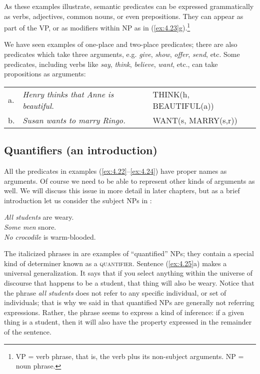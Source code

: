 As these examples illustrate, semantic predicates can be expressed grammatically as verbs, adjectives, common nouns, or even prepositions. They can appear as part of the VP, or as modifiers within NP as in (\ref{ex:4.23}g).\footnote{VP = verb phrase, that is, the verb plus its non-subject arguments. NP = noun phrase.}



We have seen examples of one-place and two-place predicates; there are also predicates which take three arguments, e.g. \textit{give}, \textit{show}, \textit{offer}, \textit{send}, etc. Some predicates, including verbs like \textit{say}, \textit{think}, \textit{believe}, \textit{want}, etc., can take propositions as arguments:


\ea \label{ex:4.24}
\begin{tabular}[t]{lll}
a. & \textit{Henry thinks that Anne is beautiful.}  & THINK(h, BEAUTIFUL(a))\\
b. & \textit{Susan wants to marry Ringo.} & WANT(s, MARRY(s,r))
\end{tabular}
\z

\subsection{Quantifiers (an introduction)}\label{sec:4.4.1}

All the predicates in examples (\ref{ex:4.22}--\ref{ex:4.24}) have proper names as arguments. Of course we need to be able to represent other kinds of arguments as well. We will discuss this issue in more detail in later chapters, but as a brief introduction let us consider the subject NPs in :


\ea \label{ex:4.25}
\ea \textit{All students} are weary.\\
\ex \textit{Some men} snore.\\
\ex \textit{No crocodile} is warm-blooded.
                       \z
\z

The italicized phrases in  are examples of “quantified” NPs; they contain a special kind of determiner known as a \textsc{quantifier}. Sentence (\ref{ex:4.25}a) makes a universal generalization. It says that if you select anything within the universe of discourse that happens to be a student, that thing will also be weary. Notice that the phrase \textit{all students} does not refer to any specific individual, or set of individuals; that is why we said in  that quantified NPs are generally not referring expressions. Rather, the phrase seems to express a kind of inference: if a given thing is a student, then it will also have the property expressed in the remainder of the sentence.


